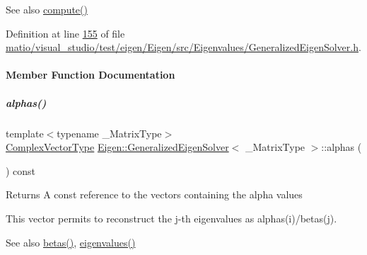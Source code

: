 \begin{DoxySeeAlso}{See also}
\hyperlink{group___eigenvalues___module_a275910b47dfe5f40211dcb59cfd68f3c}{compute()} 
\end{DoxySeeAlso}


Definition at line \hyperlink{matio_2visual__studio_2test_2eigen_2_eigen_2src_2_eigenvalues_2_generalized_eigen_solver_8h_source_l00155}{155} of file \hyperlink{matio_2visual__studio_2test_2eigen_2_eigen_2src_2_eigenvalues_2_generalized_eigen_solver_8h_source}{matio/visual\+\_\+studio/test/eigen/\+Eigen/src/\+Eigenvalues/\+Generalized\+Eigen\+Solver.\+h}.



\paragraph{Member Function Documentation}
\mbox{\label{group___eigenvalues___module_a82b1bc41267f46e5c5899d5b084a73bb}} 
\subparagraph{\texorpdfstring{alphas()}{alphas()}\hspace{0.1cm}{\footnotesize\ttfamily [1/2]}}
{\footnotesize\ttfamily template$<$typename \+\_\+\+Matrix\+Type$>$ \\
\hyperlink{group___eigenvalues___module_acfd144329aca76882069da2fc5d53ef5}{Complex\+Vector\+Type} \hyperlink{group___eigenvalues___module_class_eigen_1_1_generalized_eigen_solver}{Eigen\+::\+Generalized\+Eigen\+Solver}$<$ \+\_\+\+Matrix\+Type $>$\+::alphas (\begin{DoxyParamCaption}{ }\end{DoxyParamCaption}) const\hspace{0.3cm}{\ttfamily [inline]}}

\begin{DoxyReturn}{Returns}
A const reference to the vectors containing the alpha values
\end{DoxyReturn}
This vector permits to reconstruct the j-\/th eigenvalues as alphas(i)/betas(j).

\begin{DoxySeeAlso}{See also}
\hyperlink{group___eigenvalues___module_abeaa6f56cee367b83fd09d428462ca0c}{betas()}, \hyperlink{group___eigenvalues___module_a62f01cd78271efd5e39bcb24e0fe1a58}{eigenvalues()} 
\end{DoxySeeAlso}


